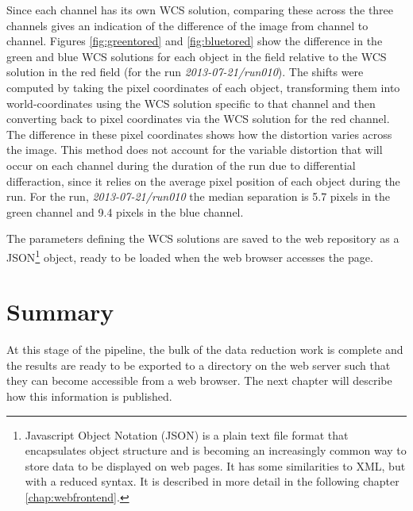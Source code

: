 Since each channel has its own WCS solution, comparing these across the three channels gives an indication of the difference of the image from channel to channel. Figures \ref{fig:greentored} and \ref{fig:bluetored} show the difference in the green and blue WCS solutions for each object in the field relative to the WCS solution in the red field (for the run \emph{2013-07-21/run010}). The shifts were computed by taking the pixel coordinates of each object, transforming them into world-coordinates using the WCS solution specific to that channel and then converting back to pixel coordinates via the WCS solution for the red channel. The difference in these pixel coordinates shows how the distortion varies across the image. This method does not account for the variable distortion that will occur on each channel during the duration of the run due to differential differaction, since it relies on the average pixel position of each object during the run. For the run, \emph{2013-07-21/run010} the median separation is 5.7 pixels in the green channel and 9.4 pixels in the blue channel. 

The parameters defining the WCS solutions are saved to the web repository as a JSON\footnote{Javascript Object Notation (JSON) is a plain text file format that encapsulates object structure and is becoming an increasingly common way to store data to be displayed on web pages. It has some similarities to XML, but with a reduced syntax. It is described in more detail in the following chapter \ref{chap:webfrontend}.} object, ready to be loaded when the web browser accesses the page. 

\section{Summary}
At this stage of the pipeline, the bulk of the data reduction work is complete and the results are ready to be exported to a directory on the web server such that they can become accessible from a web browser. The next chapter will describe how this information is published.  
